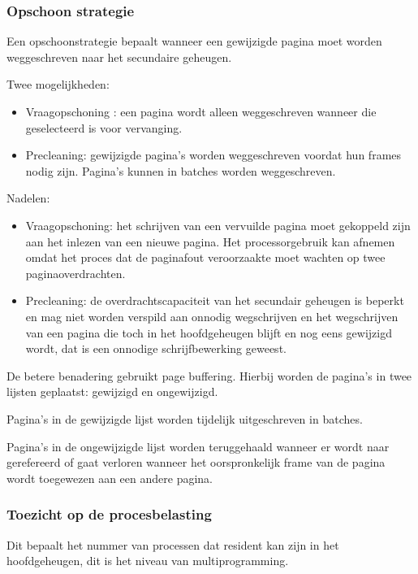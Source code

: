 \subsubsection{Opschoon strategie}

Een opschoonstrategie bepaalt wanneer een gewijzigde pagina moet worden weggeschreven naar het secundaire geheugen.

Twee mogelijkheden:

\begin{itemize}
\item Vraagopschoning : een pagina wordt alleen weggeschreven wanneer die geselecteerd is voor vervanging.
\item Precleaning:  gewijzigde pagina's worden weggeschreven voordat hun frames nodig zijn. Pagina’s kunnen in batches worden weggeschreven.
\end{itemize}

Nadelen:

\begin{itemize}
\item Vraagopschoning: het schrijven van een vervuilde pagina moet gekoppeld zijn aan het inlezen van een nieuwe pagina. Het processorgebruik kan afnemen omdat het proces dat de paginafout veroorzaakte moet wachten op twee paginaoverdrachten.
\item Precleaning: de overdrachtscapaciteit van het secundair geheugen is beperkt en mag niet worden verspild aan onnodig wegschrijven en het wegschrijven van een pagina die toch in het hoofdgeheugen blijft en nog eens gewijzigd wordt, dat is een onnodige schrijfbewerking geweest.
\end{itemize}	

De betere benadering gebruikt page buffering. Hierbij worden de pagina’s in twee lijsten geplaatst: gewijzigd en ongewijzigd.

Pagina’s in de gewijzigde lijst worden tijdelijk uitgeschreven in batches.

Pagina’s in de ongewijzigde lijst worden teruggehaald wanneer er wordt naar gerefereerd of gaat verloren wanneer het oorspronkelijk frame van de pagina wordt toegewezen aan een andere pagina.

\subsubsection{Toezicht op de procesbelasting}

Dit bepaalt het nummer van processen dat resident kan zijn in het hoofdgeheugen, dit is het niveau van multiprogramming.

